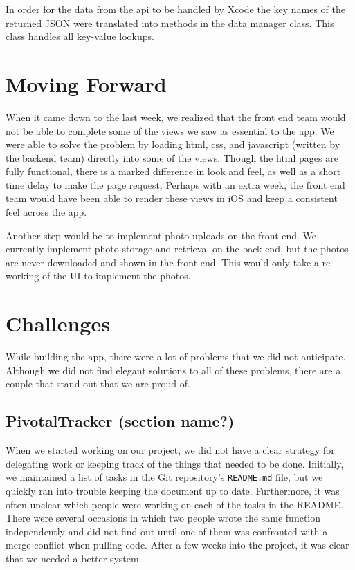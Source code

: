 \documentclass[12pt]{article}
\begin{document}
\bigskip

In order for the data from the api to be handled by Xcode the key names of the returned JSON were translated into methods in the data manager class. This class handles all key-value lookups. 

\section{Moving Forward}

When it came down to the last week, we realized that the front end team would not be able to complete some of the views we saw as essential to the app. 
We were able to solve the problem by loading html, css, and javascript (written by the backend team) directly into some of the views. 
Though the html pages are fully functional, there is a marked difference in look and feel, as well as a short time delay to make the page request. 
Perhaps with an extra week, the front end team would have been able to render these views in iOS and keep a consistent feel across the app. 

\bigskip

Another step would be to implement photo uploads on the front end.
We currently implement photo storage and retrieval on the back end, but the photos are never downloaded and shown in the front end.
This would only take a re-working of the UI to implement the photos.

\bigskip

\section{Challenges}

While building the app, there were a lot of problems that we did not anticipate.
Although we did not find elegant solutions to all of these problems,
there are a couple that stand out that we are proud of.

\subsection{PivotalTracker (section name?)}

When we started working on our project, we did not have a clear strategy for 
delegating work or keeping track of the things that needed to be done.
Initially, we maintained a list of tasks in the Git repository's \texttt{README.md} file,
but we quickly ran into trouble keeping the document up to date.
Furthermore, it was often unclear which people were working on each of the tasks in the README.
There were several occasions in which two people wrote the same function independently
and did not find out until one of them was confronted with a merge conflict when pulling code.
After a few weeks into the project, it was clear that we needed a better system.
\end{document}
